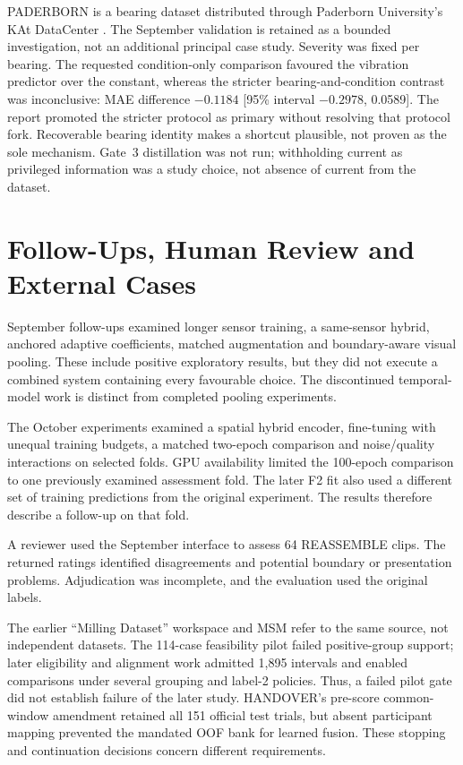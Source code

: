 PADERBORN is a bearing dataset distributed through Paderborn University's KAt DataCenter
\parencite{Lessmeier2016Paderborn,PaderbornKAtDataCenter}. The September validation is
retained as a bounded investigation, not an additional principal case study. Severity was
fixed per bearing. The requested
condition-only comparison favoured the vibration predictor over the constant, whereas the
stricter bearing-and-condition contrast was inconclusive: MAE difference $-0.1184$ [95\%
interval $-0.2978$, 0.0589]. The report promoted the stricter protocol as primary without
resolving that protocol fork. Recoverable bearing identity makes a shortcut plausible,
not proven as the sole mechanism. Gate~3 distillation was not run; withholding current
as privileged information was a study choice, not absence of current from the
dataset.

\section{Follow-Ups, Human Review and External Cases}
September follow-ups examined longer sensor training, a same-sensor hybrid, anchored
adaptive coefficients, matched augmentation and boundary-aware visual pooling. These
include positive exploratory results, but they did not execute a combined system
containing every favourable choice. The discontinued temporal-model work is distinct from
completed pooling experiments.

The October experiments examined a spatial hybrid encoder, fine-tuning with unequal
training budgets, a matched two-epoch comparison and noise/quality interactions on
selected folds. GPU availability limited the 100-epoch comparison to one previously
examined assessment fold. The later F2 fit also used a different set of training
predictions from the original experiment. The results therefore describe a follow-up on
that fold.

A reviewer used the September interface to assess 64 REASSEMBLE clips. The returned
ratings identified disagreements and potential boundary or presentation problems.
Adjudication was incomplete, and the evaluation used the original labels.

The earlier \enquote{Milling Dataset} workspace and MSM refer to the same source, not
independent datasets. The 114-case feasibility pilot failed positive-group support;
later eligibility and alignment work admitted 1,895 intervals and enabled comparisons
under several grouping and label-2 policies. Thus, a failed pilot gate did not establish
failure of the later study. HANDOVER's pre-score common-window amendment retained all
151 official test trials, but absent participant mapping prevented the mandated OOF bank
for learned fusion. These stopping and continuation decisions concern different
requirements.

